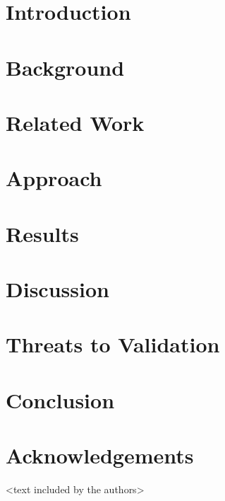 \documentclass[sigconf]{acmart}
\begin{document}
\section{Introduction}
\label{sec:introduction}


\section{Background}
\label{sec:background}


\section{Related Work}
\label{sec:related-work}


\section{Approach}
\label{sec:approach}


\section{Results}
\label{sec:results}


\section{Discussion}
\label{sec:discussion}


\section{Threats to Validation}
\label{sec:threats}



\section{Conclusion}
\label{sec:conclusion}


\section*{Acknowledgements}
<text included by the authors>



\end{document}
